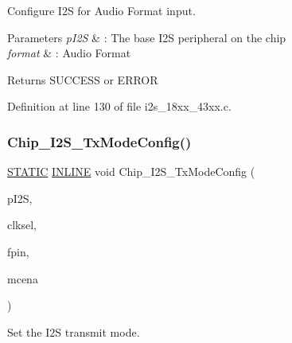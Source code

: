 Configure I2S for Audio Format input. 


\begin{DoxyParams}{Parameters}
{\em p\+I2S} & \+: The base I2S peripheral on the chip \\
\hline
{\em format} & \+: Audio Format \\
\hline
\end{DoxyParams}
\begin{DoxyReturn}{Returns}
S\+U\+C\+C\+E\+SS or E\+R\+R\+OR 
\end{DoxyReturn}


Definition at line 130 of file i2s\+\_\+18xx\+\_\+43xx.\+c.

\mbox{\label{group___i2_s__18_x_x__43_x_x_ga0c7a808e84e2c0a3f7ffbba089c7d380}} 
\subsubsection{\texorpdfstring{Chip\+\_\+\+I2\+S\+\_\+\+Tx\+Mode\+Config()}{Chip\_I2S\_TxModeConfig()}}
{\footnotesize\ttfamily \hyperlink{group___l_p_c___types___public___macros_ga10b2d890d871e1489bb02b7e70d9bdfb}{S\+T\+A\+T\+IC} \hyperlink{spifi__18xx__43xx_8h_a2eb6f9e0395b47b8d5e3eeae4fe0c116}{I\+N\+L\+I\+NE} void Chip\+\_\+\+I2\+S\+\_\+\+Tx\+Mode\+Config (\begin{DoxyParamCaption}\item[{\hyperlink{struct_l_p_c___i2_s___t}{L\+P\+C\+\_\+\+I2\+S\+\_\+T} $\ast$}]{p\+I2S,  }\item[{uint32\+\_\+t}]{clksel,  }\item[{uint32\+\_\+t}]{fpin,  }\item[{uint32\+\_\+t}]{mcena }\end{DoxyParamCaption})}



Set the I2S transmit mode. 


